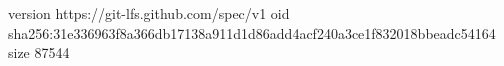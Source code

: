 version https://git-lfs.github.com/spec/v1
oid sha256:31e336963f8a366db17138a911d1d86add4acf240a3ce1f832018bbeadc54164
size 87544
